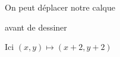 \documentclass[preview]{standalone}
\begin{document}
\begin{center}
On peut déplacer notre calque 

avant de dessiner

Ici $(x,y) \mapsto (x + 2, y + 2)$
\end{center}
\end{document}
